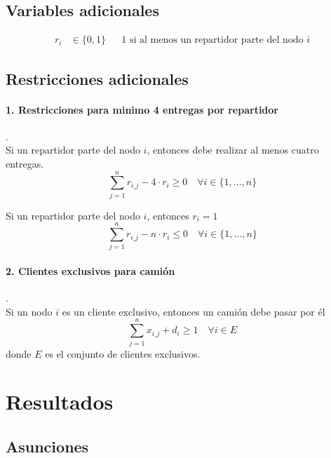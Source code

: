 \documentclass{article}
\begin{document}
    \subsection*{Variables adicionales}
    
    \begin{align*}
        r_{i} &\in \{0,1\} && \text{1 si al menos un repartidor parte del nodo } i 
    \end{align*}
    
    \subsection*{Restricciones adicionales}
    
    \paragraph{1. Restricciones para minimo 4 entregas por repartidor}.  \\
    
    Si un repartidor parte del nodo $i$, entonces debe realizar al menos cuatro entregas.
    \[
    \sum_{j=1}^{n} r_{i\_j} - 4 \cdot r_{i} \geq 0 \quad \forall i \in \{1, \dots, n\}
    \]
    
    Si un repartidor parte del nodo $i$, entonces $r_i = 1$
    \[
    \sum_{j=1}^{n} r_{i\_j} - n \cdot r_{i} \leq 0 \quad \forall i \in \{1, \dots, n\}
    \]
    
    \paragraph{2. Clientes exclusivos para camión} . \\
    Si un nodo $i$ es un cliente exclusivo, entonces un camión debe pasar por él
    \[
    \sum_{j=1}^{n} x_{i\_j} + d_{i} \geq 1 \quad \forall i \in E
    \]
    donde $E$ es el conjunto de clientes exclusivos.
    
    
    \section{Resultados}
    
    \subsection{Asunciones}
    
\end{document}
